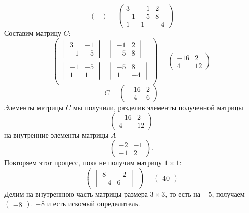 \documentclass[12pt, a4paper]{article}
\begin{document}
\begin{exmp}
\[\begin{pmatrix}
                \end{pmatrix} = \begin{pmatrix}
                3 & -1 & 2 \\
                -1 & -5 & 8 \\
                1 & 1 & -4
            \end{pmatrix} 
        \] 
        Составим матрицу \( C \): \[
            \begin{pmatrix}
                \begin{vmatrix} 3 & -1 \\ -1 & -5\end{vmatrix} & 
                \begin{vmatrix} -1 & 2 \\ -5 & 8\end{vmatrix} \\[4ex]

                \begin{vmatrix} -1 & -5 \\ 1 & 1\end{vmatrix} & 
                \begin{vmatrix} -5 & 8 \\ 1 & -4\end{vmatrix} \\
                \end{pmatrix} = \begin{pmatrix} -16 & 2 \\ 4 & 12 \end{pmatrix} 
        \] \[
                C = \begin{pmatrix} -16 & 2 \\ -4 & 6 \end{pmatrix} 
        \]Элементы матрицы \( C \) мы получили, разделив элементы полученной матрицы \[
                \begin{pmatrix} -16 & 2 \\ 4 & 12 \end{pmatrix} 
        \]на внутренние элементы матрицы \( A \) \[
                \begin{pmatrix} -2 & -1 \\ -1 & 2 \end{pmatrix}.
        \]Повторяем этот процесс, пока не получим матрицу \( 1 \times 1 \):
        \[
            \begin{pmatrix} \begin{vmatrix}
                8 & -2 \\ -4 & 6
            \end{vmatrix} \end{pmatrix} = \begin{pmatrix} 40 \end{pmatrix} 
        \]Делим на внутреннюю часть матрицы размера \( 3 \times 3 \), то есть на \( -5 \), получаем \( \begin{pmatrix} -8 \end{pmatrix}  \). \( -8 \) и есть искомый определитель.
    \end{exmp}
\end{document}
